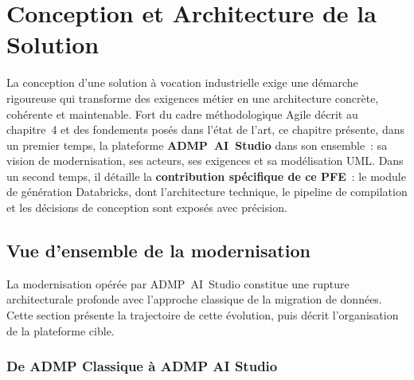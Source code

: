 \chapter{Conception et Architecture de la Solution}
\label{chap:conception}

La conception d'une solution à vocation industrielle exige une démarche rigoureuse qui transforme des exigences métier en une architecture concrète, cohérente et maintenable. Fort du cadre méthodologique Agile décrit au chapitre~4 et des fondements posés dans l'état de l'art, ce chapitre présente, dans un premier temps, la plateforme \textbf{ADMP~AI~Studio} dans son ensemble~: sa vision de modernisation, ses acteurs, ses exigences et sa modélisation UML. Dans un second temps, il détaille la \textbf{contribution spécifique de ce PFE}~: le module de génération Databricks, dont l'architecture technique, le pipeline de compilation et les décisions de conception sont exposés avec précision.

\section{Vue d'ensemble de la modernisation}
\label{sec:vue-ensemble}

La modernisation opérée par ADMP~AI~Studio constitue une rupture architecturale profonde avec l'approche classique de la migration de données. Cette section présente la trajectoire de cette évolution, puis décrit l'organisation de la plateforme cible.

\subsection{De ADMP Classique à ADMP AI Studio}
\label{subsec:avant-apres}

